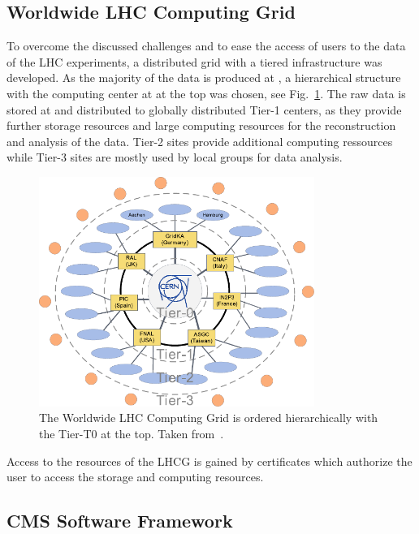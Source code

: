 \subsection{Worldwide LHC Computing Grid}

To overcome the discussed challenges and to ease the access of users to the data of
the LHC experiments, a distributed grid with a tiered infrastructure was
developed. As the majority of the data is produced at \CERN, a hierarchical
structure with the computing center at \CERN at the top was
chosen, see Fig.~\ref{fig:lhc_tier_structure}. The raw data is stored at \CERN
and distributed to globally distributed Tier-1 centers, as they provide further
storage resources and large computing resources for the reconstruction and
analysis of the data. Tier-2 sites provide additional computing ressources while
Tier-3 sites are mostly used by local groups for data analysis.

\begin{figure}[htp]
    \centering
    \includegraphics[width=0.8\textwidth]{figures/cms_detector/lhcg.pdf}\hfill
    \caption[Tiered structure of the worldwide LHC Computing Grid]{The Worldwide
        LHC Computing Grid is ordered hierarchically with the \CERN Tier-T0 at the top. Taken
        from~\cite{Stober:2012abc}.}
    \label{fig:lhc_tier_structure}
\end{figure}

Access to the resources of the LHCG is gained by certificates which authorize
the user to access the storage and computing resources.


\subsection{CMS Software Framework}

